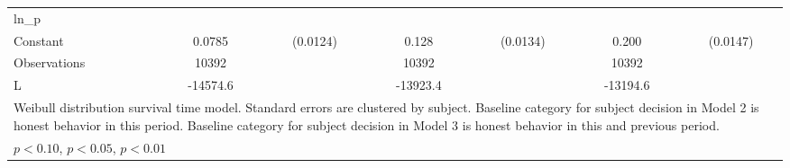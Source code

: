 {\begin{tabular}{l*{3}{cc}}
\hline
ln\_p            &                  &         &                  &         &                  &         \\
Constant        &   0.0785\sym{***}& (0.0124)&    0.128\sym{***}& (0.0134)&    0.200\sym{***}& (0.0147)\\
\hline
Observations    &    10392         &         &    10392         &         &    10392         &         \\
L               & -14574.6         &         & -13923.4         &         & -13194.6         &         \\
\hline\hline
\multicolumn{7}{l}{\footnotesize Weibull distribution survival time model. Standard errors are clustered by subject. Baseline category for subject decision in Model 2 is honest behavior in this period. Baseline category for subject decision in Model 3 is honest behavior in this and previous period.}\\
\multicolumn{7}{l}{\footnotesize \sym{*} \(p<0.10\), \sym{**} \(p<0.05\), \sym{***} \(p<0.01\)}\\
\end{tabular}
}
